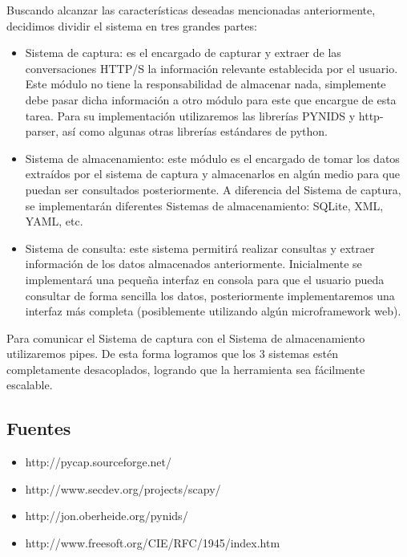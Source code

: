 Buscando alcanzar las características deseadas mencionadas anteriormente, decidimos dividir el sistema en tres grandes partes:

\begin{itemize}
\item Sistema de captura: es el encargado de capturar y extraer de las conversaciones HTTP/S la información relevante establecida por el usuario. Este módulo no tiene la responsabilidad de almacenar nada, simplemente debe pasar dicha información a otro módulo para este que encargue de esta tarea. Para su implementación utilizaremos las librerías PYNIDS y http-parser, así como algunas otras librerías estándares de python. 
\item Sistema de almacenamiento: este módulo es el encargado de tomar los datos extraídos por el sistema de captura y almacenarlos en algún medio para que puedan ser consultados posteriormente. A diferencia del Sistema de captura, se implementarán diferentes Sistemas de almacenamiento: SQLite, XML, YAML, etc.
\item Sistema de consulta: este sistema permitirá realizar consultas y extraer información de los datos almacenados anteriormente. Inicialmente se implementará una pequeña interfaz en consola para que el usuario pueda consultar de forma sencilla los datos, posteriormente implementaremos una interfaz más completa (posiblemente utilizando algún microframework web).
\end{itemize}

Para comunicar el Sistema de captura con el Sistema de almacenamiento utilizaremos pipes. De esta forma logramos que los 3 sistemas estén completamente desacoplados, logrando que la herramienta sea fácilmente escalable.

\subsection*{Fuentes}

\begin{itemize}
\item http://pycap.sourceforge.net/
\item http://www.secdev.org/projects/scapy/
\item http://jon.oberheide.org/pynids/
\item http://www.freesoft.org/CIE/RFC/1945/index.htm
\end{itemize}

